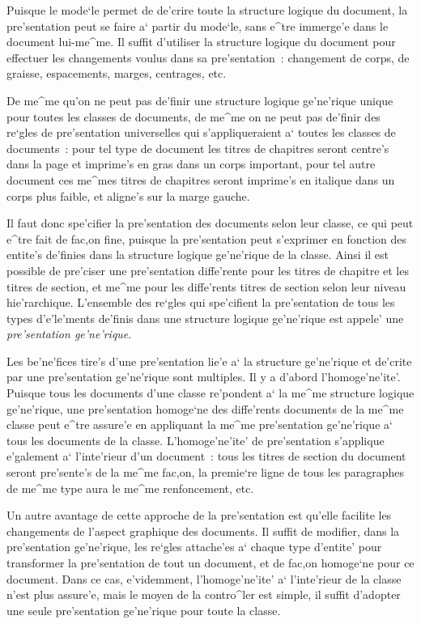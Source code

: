 Puisque le mode`le permet de de'crire toute la structure logique du document, la
pre'sentation peut se faire a` partir du mode`le, sans e^tre immerge'e dans
le document lui-me^me. Il suffit d'utiliser la structure logique du document
pour effectuer les changements voulus dans sa pre'sentation~: changement
de corps, de graisse, espacements, marges, centrages, etc.

De me^me qu'on ne peut pas de'finir une structure logique ge'ne'rique unique
pour toutes les classes de documents, de me^me on ne peut pas de'finir des
re`gles de pre'sentation universelles qui s'appliqueraient a` toutes les classes
de documents~: pour tel type de document les titres de chapitres seront
centre's dans la page et imprime's en gras dans un corps important, pour tel
autre document ces me^mes titres de chapitres seront imprime's en italique
dans un corps plus faible, et aligne's sur la marge gauche.

Il faut donc spe'cifier la pre'sentation des documents selon leur classe,
ce qui peut e^tre fait de fac,on fine, puisque la pre'sentation peut
s'exprimer en fonction des entite's de'finies dans la structure logique
ge'ne'rique de la classe. Ainsi il est possible de pre'ciser une pre'sentation
diffe'rente pour les titres de chapitre et les titres de section, et me^me
pour les diffe'rents titres de section selon leur niveau hie'rarchique.
L'ensemble des re`gles qui spe'cifient la pre'sentation de tous les types
d'e'le'ments de'finis dans une structure logique ge'ne'rique est appele' une
{\em pre'sentation ge'ne'rique}.

Les be'ne'fices tire's d'une pre'sentation lie'e a` la structure ge'ne'rique
et de'crite par une pre'sentation ge'ne'rique sont multiples. Il y a d'abord
l'homoge'ne'ite'. Puisque tous les documents d'une classe re'pondent a` la
me^me structure logique ge'ne'rique, une pre'sentation homoge`ne des
diffe'rents documents de la me^me classe peut e^tre assure'e en appliquant la
me^me pre'sentation ge'ne'rique a` tous les documents de la classe.
L'homoge'ne'ite' de pre'sentation s'applique e'galement a` l'inte'rieur d'un
document~: tous les titres de section du document seront pre'sente's de
la me^me fac,on, la premie`re ligne de tous les paragraphes de me^me type
aura le me^me renfoncement, etc.

Un autre avantage de cette approche de la pre'sentation est qu'elle
facilite les changements de l'aspect graphique des documents. Il suffit de
modifier, dans la pre'sentation ge'ne'rique, les re`gles attache'es a` chaque
type d'entite' pour transformer la pre'sentation de tout un document,
et de fac,on homoge`ne pour ce document. Dans ce cas, e'videmment,
l'homoge'ne'ite' a` l'inte'rieur de la classe n'est plus assure'e, mais le
moyen de la contro^ler est simple, il suffit d'adopter une seule pre'sentation
ge'ne'rique pour toute la classe.

